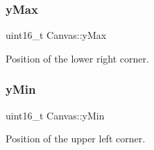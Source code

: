 \subsubsection{\texorpdfstring{y\+Max}{yMax}}
{\footnotesize\ttfamily uint16\+\_\+t Canvas\+::y\+Max}



Position of the lower right corner. 

\mbox{\label{group__canvas_ga91a71d5f9030202359d000a5fb54423a}} 
\subsubsection{\texorpdfstring{y\+Min}{yMin}}
{\footnotesize\ttfamily uint16\+\_\+t Canvas\+::y\+Min}



Position of the upper left corner. 

